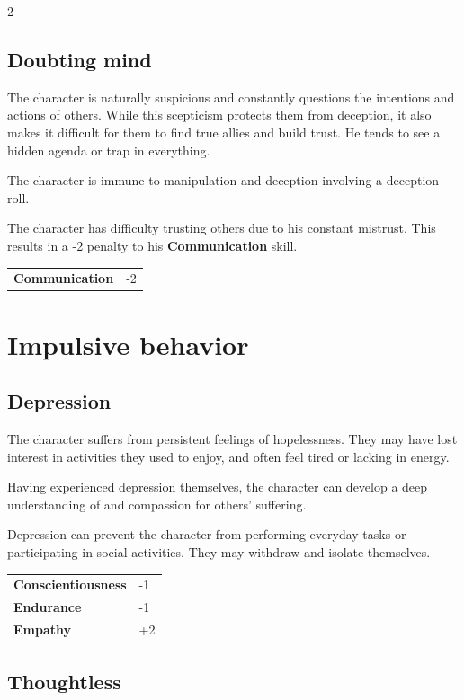 \begin{multicols}{2}
    \subsection*{Doubting mind}

    The character is naturally suspicious and constantly questions the intentions and actions of others. While this scepticism protects them from deception, it also makes it difficult for them to find true allies and build trust. He tends to see a hidden agenda or trap in everything.

    The character is immune to manipulation and deception involving a deception roll.

    The character has difficulty trusting others due to his constant mistrust. This results in a -2 penalty to his \textbf{Communication} skill.

    \begin{tabular}{@{}ll@{}}
        \textbf{Communication} & -2\\
    \end{tabular}

    \section{Impulsive behavior}

    \subsection*{Depression}

    The character suffers from persistent feelings of hopelessness. They may have lost interest in activities they used to enjoy, and often feel tired or lacking in energy.

    Having experienced depression themselves, the character can develop a deep understanding of and compassion for others' suffering.

    Depression can prevent the character from performing everyday tasks or participating in social activities. They may withdraw and isolate themselves.

    \begin{tabular}{@{}ll@{}}
        \textbf{Conscientiousness} & -1\\
        \textbf{Endurance} & -1\\
        \textbf{Empathy} & +2\\
    \end{tabular}

    \subsection*{Thoughtless}


\end{multicols}
